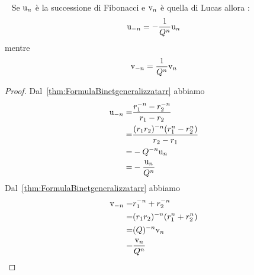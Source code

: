 \begin{thm}\label{thm:FormulaBinetgeneralizzatavalneg}~\cite{Rabinowitz_1996}
	Se $\mathrm{u}_{n}$ è la successione di Fibonacci e  $\mathrm{v}_{n}$ è quella di Lucas 
	allora : \begin{equation}
		\mathrm{u}_{-n}=-\dfrac{1}{Q^n}	\mathrm{u}_{n}
	\end{equation}
	mentre \begin{equation}
		\mathrm{v}_{-n}=\dfrac{1}{Q^n}	\mathrm{v}_{n}
	\end{equation}
\end{thm}
\begin{proof}
	Dal~\vref{thm:FormulaBinetgeneralizzatarr} abbiamo
	\begin{align*}
		\mathrm{u}_{-n}=&{}\dfrac{r_{1}^{-n}-r_{2}^{-n}}{r_{1}-r_{2}}\\
		=&{}\dfrac{(r_1r_2)^{-n}(r_{1}^{n}-r_{2}^{n})}{r_{2}-r_{1}}\\
		=&{}-Q^{-n}\mathrm{u}_{n}\\
		=&{}-\dfrac{\mathrm{u}_{n}}{Q^{n}}  \\
	\end{align*}
	Dal~\vref{thm:FormulaBinetgeneralizzatarr} abbiamo
\begin{align*}
	\mathrm{v}_{-n}=&{}r_{1}^{-n}+r_{2}^{-n}\\
	=&{}(r_1r_2)^{-n}(r_{1}^{n}+r_{2}^{n})\\
	=&{}(Q)^{-n}\mathrm{v}_{n}\\
	=&{}\dfrac{\mathrm{v}_{n}}{Q^n}
\end{align*}
\end{proof}
